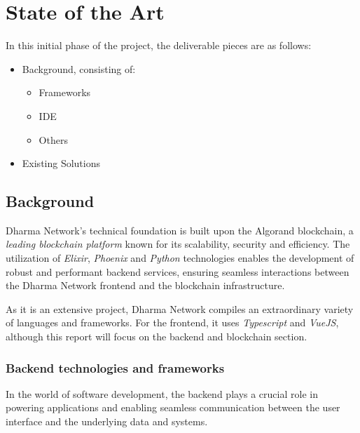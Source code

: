 \newcommand{\danger}{\faIcon{exclamation-triangle}}

\chapter{State of the Art} \label{chap:sota}


 In this initial phase of the project, the deliverable pieces are as follows:

 \begin{itemize}
     \item Background, consisting of:
     \begin{itemize}
         \item Frameworks
        \item IDE
        \item Others
    \end{itemize}
     \item Existing Solutions
 \end{itemize}


\section{Background}

Dharma Network's technical foundation is built upon the Algorand blockchain, a \textit{leading blockchain platform} known for its scalability, security and efficiency. The utilization of \textit{Elixir}, \textit{Phoenix} and \textit{Python }technologies enables the development of robust and performant backend services, ensuring seamless interactions between the Dharma Network frontend and the blockchain infrastructure.

As it is an extensive project, Dharma Network compiles an extraordinary variety of languages and frameworks.
For the frontend, it uses \textit{Typescript} and \textit{VueJS}, although this report will focus on the backend and blockchain section. \newline

\subsection{Backend technologies and frameworks}

In the world of software development, the backend plays a crucial role in powering applications and enabling seamless communication between the user interface and the underlying data and systems.\newline

